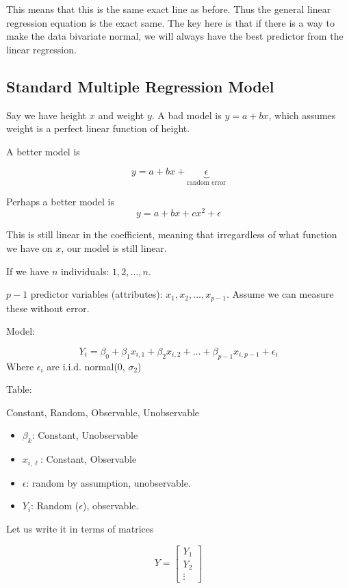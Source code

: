 \documentclass{report}
\begin{document}
This means that this is the same exact line as before. Thus the general linear regression equation is the exact same. The key here is that if there is a way to make the data bivariate normal, we will always have the best predictor from the linear regression.


\subsection{Standard Multiple Regression Model}

Say we have height $x$ and weight $y$. A bad model is $y= a + bx$, which assumes weight is a perfect linear function of height. 

A better model is 

\[
	y = a+ bx + \underbrace{\epsilon}_{\text{random error}}
\]

Perhaps a better model is
\[
y = a + bx + cx^{2} + \epsilon
\]

This is still linear in the coefficient, meaning that irregardless of what function we have on $x$, our model is still linear. 

If we have $n$ individuals: $1,2, \dots, n$. 

$p-1$  predictor variables (attributes): $x_1, x_2, \dots, x_{p-1}$. Assume we can measure these without error.

Model: 

\[
Y_{i} = \beta_{0} + \beta_{1}x_{i, 1} + \beta_{2} x_{i, 2} + \dots + \beta_{p-1} x_{i, p-1} + \epsilon_{i}
\]
Where $\epsilon_{i}$ are i.i.d. normal(0, $\sigma_{2}$) 


Table: 

Constant, Random, Observable, Unobservable

\begin{itemize}
	\item $\beta_{k}$: Constant, Unobservable
	\item $x_{i, \ell}$: Constant, Observable 
	\item $\epsilon$: random by assumption, unobservable. 
	\item $Y_{i}$: Random ($\epsilon$), observable.
\end{itemize}


Let us write it in terms of matrices 


\[
Y = \begin{bmatrix}
	Y_1\\
	Y_2\\
	\vdots
\end{bmatrix}
\]
\end{document}
